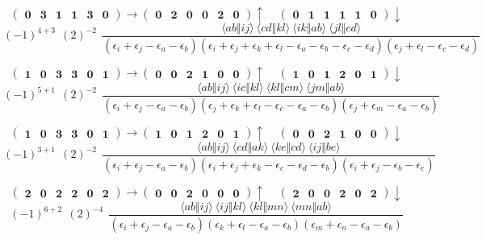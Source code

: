 \documentclass[12pt,oneside,a4paper,fleqn]{article}
\begin{document}
\[ \boldsymbol{ \begin{pmatrix} 0 & 3 & 1 & 1 & 3 & 0 \end{pmatrix} \rightarrow \begin{pmatrix} 0 & 2 & 0 & 0 & 2 & 0 \end{pmatrix} \uparrow~~~~~\begin{pmatrix} 0 & 1 & 1 & 1 & 1 & 0 \end{pmatrix} \downarrow } \]
$$(-1)^{4+3}~~(2)^{-2}~~\frac{\langle ab \Vert ij \rangle ~\langle cd \Vert kl \rangle ~\langle ik \Vert ab \rangle ~\langle jl \Vert cd \rangle }{(\epsilon_i +\epsilon_j -\epsilon_a -\epsilon_b ) (\epsilon_i +\epsilon_j +\epsilon_k +\epsilon_l -\epsilon_a -\epsilon_b -\epsilon_c -\epsilon_d ) (\epsilon_j +\epsilon_l -\epsilon_c -\epsilon_d ) }$$

\[ \boldsymbol{ \begin{pmatrix} 1 & 0 & 3 & 3 & 0 & 1 \end{pmatrix} \rightarrow \begin{pmatrix} 0 & 0 & 2 & 1 & 0 & 0 \end{pmatrix} \uparrow~~~~~\begin{pmatrix} 1 & 0 & 1 & 2 & 0 & 1 \end{pmatrix} \downarrow } \]
$$(-1)^{5+1}~~(2)^{-2}~~\frac{\langle ab \Vert ij \rangle ~\langle ic \Vert kl \rangle ~\langle kl \Vert cm \rangle ~\langle jm \Vert ab \rangle }{(\epsilon_i +\epsilon_j -\epsilon_a -\epsilon_b ) (\epsilon_j +\epsilon_k +\epsilon_l -\epsilon_c -\epsilon_a -\epsilon_b ) (\epsilon_j +\epsilon_m -\epsilon_a -\epsilon_b ) }$$

\[ \boldsymbol{ \begin{pmatrix} 1 & 0 & 3 & 3 & 0 & 1 \end{pmatrix} \rightarrow \begin{pmatrix} 1 & 0 & 1 & 2 & 0 & 1 \end{pmatrix} \uparrow~~~~~\begin{pmatrix} 0 & 0 & 2 & 1 & 0 & 0 \end{pmatrix} \downarrow } \]
$$(-1)^{3+1}~~(2)^{-2}~~\frac{\langle ab \Vert ij \rangle ~\langle cd \Vert ak \rangle ~\langle ke \Vert cd \rangle ~\langle ij \Vert be \rangle }{(\epsilon_i +\epsilon_j -\epsilon_a -\epsilon_b ) (\epsilon_i +\epsilon_j +\epsilon_k -\epsilon_c -\epsilon_d -\epsilon_b ) (\epsilon_i +\epsilon_j -\epsilon_b -\epsilon_e ) }$$

\[ \boldsymbol{ \begin{pmatrix} 2 & 0 & 2 & 2 & 0 & 2 \end{pmatrix} \rightarrow \begin{pmatrix} 0 & 0 & 2 & 0 & 0 & 0 \end{pmatrix} \uparrow~~~~~\begin{pmatrix} 2 & 0 & 0 & 2 & 0 & 2 \end{pmatrix} \downarrow } \]
$$(-1)^{6+2}~~(2)^{-4}~~\frac{\langle ab \Vert ij \rangle ~\langle ij \Vert kl \rangle ~\langle kl \Vert mn \rangle ~\langle mn \Vert ab \rangle }{(\epsilon_i +\epsilon_j -\epsilon_a -\epsilon_b ) (\epsilon_k +\epsilon_l -\epsilon_a -\epsilon_b ) (\epsilon_m +\epsilon_n -\epsilon_a -\epsilon_b ) }$$
\end{document}
